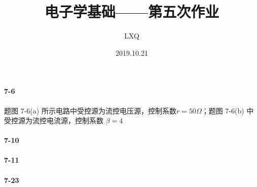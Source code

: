 \documentclass[hyperref, UTF8]{ctexart}
\title{电子学基础——第五次作业}
\author{LXQ}
\date{2019.10.21}
\newcommand{\ohm}{\Omega}
\begin{document}
\maketitle

\paragraph{7-6}\label{7-6}
题图 7-6(a) 所示电路中受控源为流控电压源，控制系数$r=50\ohm$；题图 7-6(b) 中受控源为流控电流源，控制系数 $\beta = 4$

\paragraph{7-10}\label{7-10}

\paragraph{7-11}\label{7-11}

\paragraph{7-23}\label{7-23}
\end{document}
